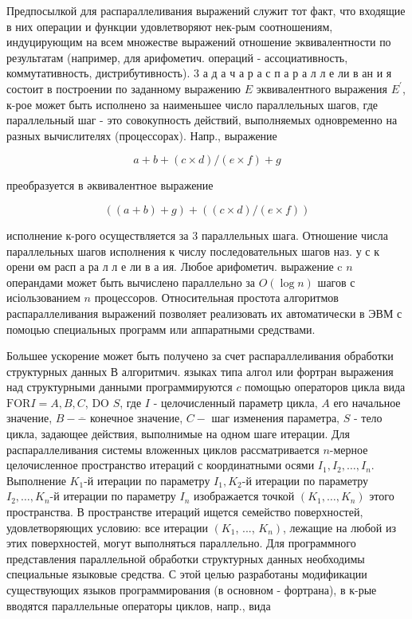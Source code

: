 \documentclass[10pt]{article}
\begin{document}
Предпосылкой для распараллеливания выражений служит тот факт, что входящие в них операции и функции удовлетворяют нек-рым соотношениям, индуцирующим на всем множестве выражений отношение эквивалентности по результатам (например, для арифометич. операций - ассоциативность, коммутативность, дистрибутивность). 3 а д а ч а р а с п а р а л л е ли в ан и я состоит в построении по заданному выражению $E$ эквивалентного выражения $E^{\prime}$, к-рое может быть исполнено за наименьшее число параллельных шагов, где параллельный шаг - это совокупность действий, выполняемых одновременно на разных вычислителях (процессорах). Напр., выражение



\[

a+b+(c \times d) /(e \times f)+g

\]



преобразуется в әквивалентное выражение



\[

((a+b)+g)+((c \times d) /(e \times f))

\]



исполнение к-рого осуществляется за 3 параллельных шага. Отношение числа параллельных шагов исполнения к числу последовательных шагов наз. у с к орени өм расп а ра л л е ли в а ия. Любое арифометич. выражение c $n$ операндами может быть вычислено параллельно за $O(\log n)$ шагов с исіользованием $n$ процессоров. Относительная простота алгоритмов распараллеливания выражений позволяет реализовать их автоматически в ЭВМ с помоцью специальных программ или аппаратными средствами.



Большее ускорение может быть получено за счет распараллеливания обработки структурных данных В алгоритмич. языках типа алгол или фортран выражения над структурными данными программируются $c$ помощью операторов цикла вида $\mathrm{FOR} I=A, B, C$, DO $S$, где $I$ - целочисленный параметр цикла, $A$ его начальное значение, $B-\overline{-}$ конечное значение, $C-$ шаг изменения параметра, $S$ - тело цикла, задающее действия, выполнимые на одном шаге итерации. Для распараллеливания системы вложенных циклов рассматривается $n$-мерное целочисленное пространство итераций с координатными осями $I_{1}, I_{2}, \ldots, I_{n}$. Выполнение $K_{1}$-й итерации по параметру $I_{1}, K_{2}$-й итерации по параметру $I_{2}, \ldots, K_{n}$-й итерации по параметру $I_{n}$ изображается точкой $\left(K_{1}, \ldots, K_{n}\right)$ этого пространства. В пространстве итераций ищется семейство поверхностей, удовлетворяющих условию: все итерации $\left(K_{1}\right.$, ..., $\left.K_{n}\right)$, лежащие на любой из этих поверхностей, могут выполняться параллельно. Для программного представления параллельной обработки структурных данных необходимы специальные языковые средства. С этой целью разработаны модификации существующих языков программирования (в основном - фортрана), в к-рые вводятся параллельные операторы циклов, напр., вида
\end{document}

